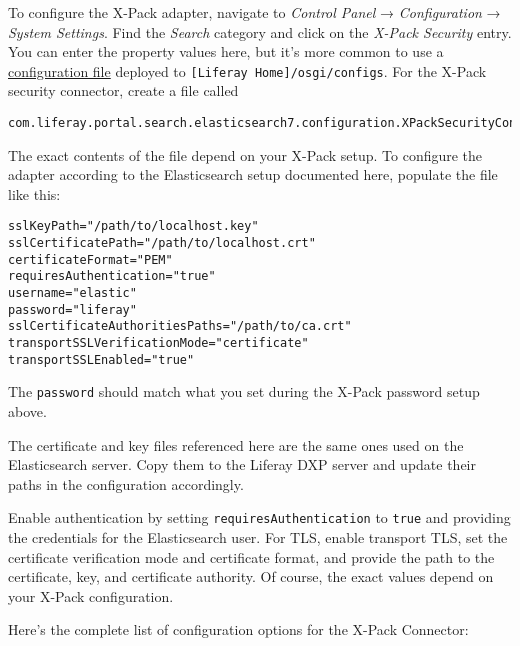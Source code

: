 To configure the X-Pack adapter, navigate to \emph{Control Panel} →
\emph{Configuration} → \emph{System Settings}. Find the \emph{Search}
category and click on the \emph{X-Pack Security} entry. You can enter
the property values here, but it's more common to use a
\href{/docs/7-2/user/-/knowledge_base/u/understanding-system-configuration-files}{configuration
file} deployed to \texttt{{[}Liferay\ Home{]}/osgi/configs}. For the
X-Pack security connector, create a file called

\begin{verbatim}
com.liferay.portal.search.elasticsearch7.configuration.XPackSecurityConfiguration.config
\end{verbatim}

The exact contents of the file depend on your X-Pack setup. To configure
the adapter according to the Elasticsearch setup documented here,
populate the file like this:

\begin{verbatim}
sslKeyPath="/path/to/localhost.key"
sslCertificatePath="/path/to/localhost.crt"
certificateFormat="PEM"
requiresAuthentication="true"
username="elastic"
password="liferay"
sslCertificateAuthoritiesPaths="/path/to/ca.crt"
transportSSLVerificationMode="certificate"
transportSSLEnabled="true"
\end{verbatim}

The \texttt{password} should match what you set during the X-Pack
password setup above.

The certificate and key files referenced here are the same ones used on
the Elasticsearch server. Copy them to the Liferay DXP server and update
their paths in the configuration accordingly.

Enable authentication by setting \texttt{requiresAuthentication} to
\texttt{true} and providing the credentials for the Elasticsearch user.
For TLS, enable transport TLS, set the certificate verification mode and
certificate format, and provide the path to the certificate, key, and
certificate authority. Of course, the exact values depend on your X-Pack
configuration.

Here's the complete list of configuration options for the X-Pack
Connector:

